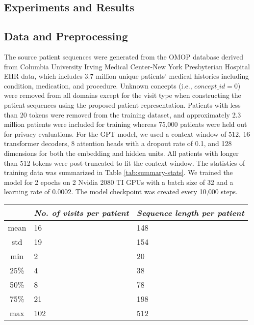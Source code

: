 \begin{multicols}{2}
\section{Experiments and Results}
\subsection{Data and Preprocessing} \label{data_processing}
The source patient sequences were generated from the OMOP database derived from Columbia University Irving Medical Center-New York Presbyterian Hospital EHR data, which includes 3.7 million unique patients' medical histories including condition, medication, and procedure. Unknown concepts (i.e., \(concept\_id=0\)) were removed from all domains except for the visit type when constructing the patient sequences using the proposed patient representation. Patients with less than 20 tokens were removed from the training dataset, and approximately 2.3 million patients were included for training whereas 75,000 patients were held out for privacy evaluations. For the GPT model, we used a context window of 512, 16 transformer decoders, 8 attention heads with a dropout rate of 0.1, and 128 dimensions for both the embedding and hidden units. All patients with longer than 512 tokens were post-truncated to fit the context window. The statistics of training data was summarized in Table \ref{tab:summary-stats}. We trained the model for 2 epochs on 2 Nvidia 2080 TI GPUs with a batch size of 32 and a learning rate of 0.0002. The model checkpoint was created every 10,000 steps. 

\begin{center}
\captionsetup{justification=raggedright,singlelinecheck=false}  %
\renewcommand{\arraystretch}{1.2} %
  \begin{tabular}{cp{3.5cm}p{3.5cm}}
  \toprule 
  \textit{}  & 
  \textit{No. of visits per patient} & \textit{Sequence length per patient}\\
  \midrule
  mean & 16 & 148\\
  std & 19 & 154\\
  min & 2 & 20\\
  25\% & 4 & 38\\
  50\% & 8 & 78\\
  75\% & 21 & 198\\
  max & 102 & 512\\
    \hline
  \end{tabular}
  \label{tab:summary-stats}
\end{center}


\end{multicols}
